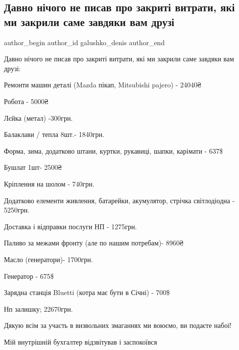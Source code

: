  
 
 
 
 

\subsection{Давно нічого не писав про закриті витрати, які ми закрили саме завдяки вам друзі}
\label{sec:09_12_2022.fb.galushko_denis.1.davno_n_chogo_ne_pis}

\ifcmt
 author_begin
   author_id galushko_denis
 author_end
\fi

Давно нічого не писав про закриті витрати, які ми закрили саме завдяки вам
друзі: 

Ремонти машин деталі (Mazda пікап, Mitsubishi pajero) - 24040₴

Робота - 5000₴ 

Лєйка (метал) -300грн.

Балаклави / тепла 8шт.- 1840грн.

Форма, зима, додатково штани, куртки, рукавиці, шапки, карімати - 637\$

Бушлат 1шт- 2500₴

Кріплення на шолом - 740грн. 

Додатково елементи живлення, батарейки, акумулятор, стрічка світлодіодна -
5250грн. 

Доставка і відправки послуги  НП - 1275грн. 

Паливо за межами фронту  (але по нашим потребам)- 8960₴

Масло (генератори)- 1700грн. 

Генератор - 675\$ 

Зарядна станція Bluetti (котра має бути в Січні) - 700\$

Нп залишку; 22670грн.

Дякую всім за участь в визвольних змаганнях ми воюємо, ви подаєте набої! 

Мій внутрішній бухгалтер відзвітував і  заспокоївся💪🏻🇺🇦
